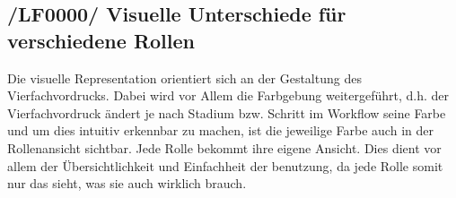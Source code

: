 \subsection{/LF0000/ Visuelle Unterschiede für verschiedene Rollen}
Die visuelle Representation orientiert sich an der Gestaltung des Vierfachvordrucks. Dabei wird vor Allem die Farbgebung weitergeführt,   
d.h. der Vierfachvordruck ändert je nach Stadium bzw. Schritt im Workflow seine Farbe und um dies intuitiv erkennbar zu machen, ist die jeweilige Farbe auch in der Rollenansicht sichtbar.
Jede Rolle bekommt ihre eigene Ansicht.  
Dies dient vor allem der Übersichtlichkeit und Einfachheit der benutzung, da jede Rolle somit nur das sieht, was sie auch wirklich brauch.  

